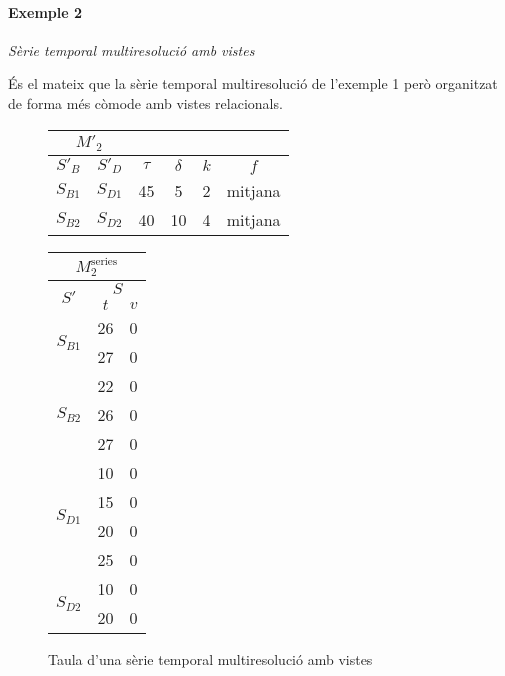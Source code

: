 \paragraph{Exemple 2} \emph{Sèrie temporal multiresolució amb vistes}

És el mateix que la sèrie temporal multiresolució de l'exemple 1 però
organitzat de forma més còmode amb vistes relacionals.



\begin{figure}[tp]
  \centering
  \begin{tabular}{|c|c|c|c|c|c|}
    \multicolumn{2}{c}{$M'_2$} \\ \hline
    $S'_B$  & $S'_D$ & $\tau$ & $\delta$ & $k$ & $f$ \\ \hline
    $S_{B1}$ & $S_{D1}$ & 45 & 5  & 2 & mitjana  \\
    $S_{B2}$ & $S_{D2}$ & 40 & 10 & 4 & mitjana  \\ \hline
  \end{tabular}\qquad
  \begin{tabular}{|c|c|c|}
    \multicolumn{3}{c}{$M^{\text{series}}_{2}$} \\ \hline
    \multirow{2}{*}{$S'$}  &  \multicolumn{2}{c|}{$S$} \\ \cline{2-3}
    & $t$      & $v$  \\ \hline
    \multirow{2}{*}{$S_{B1}$} 
    & 26 & 0 \\ 
    & 27 & 0 \\ \hline
    \multirow{3}{*}{$S_{B2}$} 
    & 22 & 0 \\ 
    & 26 & 0 \\ 
    & 27 & 0 \\ \hline
    \multirow{4}{*}{$S_{D1}$} 
    & 10 & 0 \\ 
    & 15 & 0 \\ 
    & 20 & 0 \\ 
    & 25 & 0 \\ \hline
    \multirow{2}{*}{$S_{D2}$} 
    & 10 & 0 \\ 
    & 20 & 0 \\ \hline
  \end{tabular}
  \caption{Taula d'una sèrie temporal multiresolució amb vistes}
  \label{fig:model:stm:vistes}
\end{figure}





